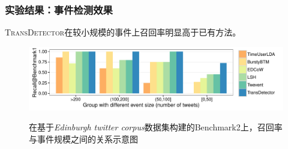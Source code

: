 \begin{frame}
\frametitle{实验结果：事件检测效果}
\noindent \textsc{TransDetector}在较小规模的事件上召回率明显高于已有方法。
\vfill
\begin{figure}[h]
	\setlength{\abovecaptionskip}{0.cm}
	\setlength{\belowcaptionskip}{0.cm}
        \centering
        \caption{在基于\textit{Edinburgh twitter corpus}数据集构建的Benchmark2上，召回率与事件规模之间的关系示意图}
        \includegraphics[width=1.0\columnwidth]{img/barchartOnBenchmark1.pdf}
        \label{fig:Benchmark1}
\end{figure}
\end{frame}

